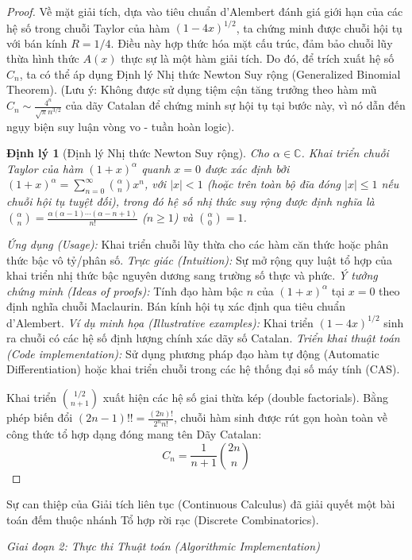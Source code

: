 \documentclass{article}
\newtheorem{dinhly}{Định lý}
\begin{document}
\begin{proof}
Về mặt giải tích, dựa vào tiêu chuẩn d'Alembert đánh giá giới hạn của các hệ số trong chuỗi Taylor của hàm $(1-4x)^{1/2}$, ta chứng minh được chuỗi hội tụ với bán kính $R=1/4$. Điều này hợp thức hóa mặt cấu trúc, đảm bảo chuỗi lũy thừa hình thức $A(x)$ thực sự là một hàm giải tích. Do đó, để trích xuất hệ số $C_n$, ta có thể áp dụng Định lý Nhị thức Newton Suy rộng (Generalized Binomial Theorem). (Lưu ý: Không được sử dụng tiệm cận tăng trưởng theo hàm mũ $C_n \sim \frac{4^n}{\sqrt{\pi} n^{3/2}}$ của dãy Catalan để chứng minh sự hội tụ tại bước này, vì nó dẫn đến ngụy biện suy luận vòng vo - tuần hoàn logic).

\begin{dinhly}[Định lý Nhị thức Newton Suy rộng]
Cho $\alpha \in \mathbb{C}$. Khai triển chuỗi Taylor của hàm $(1+x)^\alpha$ quanh $x=0$ được xác định bởi $(1+x)^\alpha = \sum_{n=0}^{\infty} \binom{\alpha}{n} x^n$, với $|x| < 1$ (hoặc trên toàn bộ đĩa đóng $|x| \le 1$ nếu chuỗi hội tụ tuyệt đối), trong đó hệ số nhị thức suy rộng được định nghĩa là $\binom{\alpha}{n} = \frac{\alpha(\alpha-1)\cdots(\alpha-n+1)}{n!}$ ($n \ge 1$) và $\binom{\alpha}{0} = 1$.
\end{dinhly}
\emph{Ứng dụng (Usage):} Khai triển chuỗi lũy thừa cho các hàm căn thức hoặc phân thức bậc vô tỷ/phân số.
\emph{Trực giác (Intuition):} Sự mở rộng quy luật tổ hợp của khai triển nhị thức bậc nguyên dương sang trường số thực và phức.
\emph{Ý tưởng chứng minh (Ideas of proofs):} Tính đạo hàm bậc $n$ của $(1+x)^\alpha$ tại $x=0$ theo định nghĩa chuỗi Maclaurin. Bán kính hội tụ xác định qua tiêu chuẩn d'Alembert.
\emph{Ví dụ minh họa (Illustrative examples):} Khai triển $(1-4x)^{1/2}$ sinh ra chuỗi có các hệ số định lượng chính xác dãy số Catalan.
\emph{Triển khai thuật toán (Code implementation):} Sử dụng phương pháp đạo hàm tự động (Automatic Differentiation) hoặc khai triển chuỗi trong các hệ thống đại số máy tính (CAS).

Khai triển $\binom{1/2}{n+1}$ xuất hiện các hệ số giai thừa kép (double factorials). Bằng phép biến đổi $(2n-1)!! = \frac{(2n)!}{2^n n!}$, chuỗi hàm sinh được rút gọn hoàn toàn về công thức tổ hợp dạng đóng mang tên Dãy Catalan:
\begin{equation*}
 C_n = \frac{1}{n+1} \binom{2n}{n}
\end{equation*}
\end{proof}
Sự can thiệp của Giải tích liên tục (Continuous Calculus) đã giải quyết một bài toán đếm thuộc nhánh Tổ hợp rời rạc (Discrete Combinatorics).

\vspace{0.5em}\noindent\emph{Giai đoạn 2: Thực thi Thuật toán (Algorithmic Implementation)}
\end{document}
